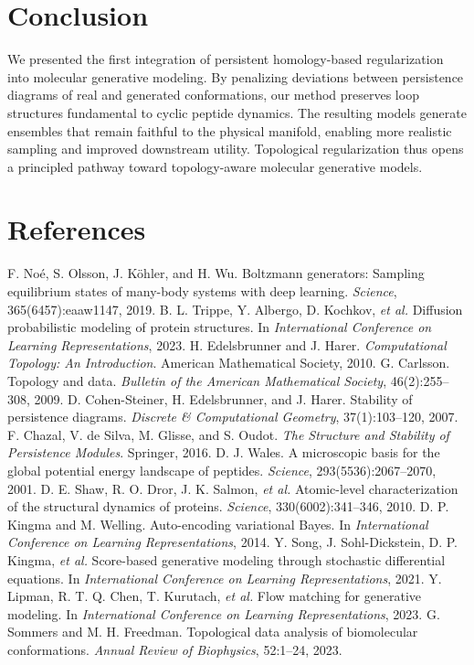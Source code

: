 \documentclass[11pt]{article}
\begin{document}
\section{Conclusion}
We presented the first integration of persistent homology-based regularization into molecular generative modeling. By penalizing deviations between persistence diagrams of real and generated conformations, our method preserves loop structures fundamental to cyclic peptide dynamics. The resulting models generate ensembles that remain faithful to the physical manifold, enabling more realistic sampling and improved downstream utility. Topological regularization thus opens a principled pathway toward topology-aware molecular generative models.

\section*{References}
\begin{thebibliography}{99}
 F. No{\'e}, S. Olsson, J. K{\"o}hler, and H. Wu. Boltzmann generators: Sampling equilibrium states of many-body systems with deep learning. \emph{Science}, 365(6457):eaaw1147, 2019.
 B. L. Trippe, Y. Albergo, D. Kochkov, \emph{et al.} Diffusion probabilistic modeling of protein structures. In \emph{International Conference on Learning Representations}, 2023.
 H. Edelsbrunner and J. Harer. \emph{Computational Topology: An Introduction}. American Mathematical Society, 2010.
 G. Carlsson. Topology and data. \emph{Bulletin of the American Mathematical Society}, 46(2):255--308, 2009.
 D. Cohen-Steiner, H. Edelsbrunner, and J. Harer. Stability of persistence diagrams. \emph{Discrete \& Computational Geometry}, 37(1):103--120, 2007.
 F. Chazal, V. de Silva, M. Glisse, and S. Oudot. \emph{The Structure and Stability of Persistence Modules}. Springer, 2016.
 D. J. Wales. A microscopic basis for the global potential energy landscape of peptides. \emph{Science}, 293(5536):2067--2070, 2001.
 D. E. Shaw, R. O. Dror, J. K. Salmon, \emph{et al.} Atomic-level characterization of the structural dynamics of proteins. \emph{Science}, 330(6002):341--346, 2010.
 D. P. Kingma and M. Welling. Auto-encoding variational Bayes. In \emph{International Conference on Learning Representations}, 2014.
 Y. Song, J. Sohl-Dickstein, D. P. Kingma, \emph{et al.} Score-based generative modeling through stochastic differential equations. In \emph{International Conference on Learning Representations}, 2021.
 Y. Lipman, R. T. Q. Chen, T. Kurutach, \emph{et al.} Flow matching for generative modeling. In \emph{International Conference on Learning Representations}, 2023.
 G. Sommers and M. H. Freedman. Topological data analysis of biomolecular conformations. \emph{Annual Review of Biophysics}, 52:1--24, 2023.
\end{thebibliography}
\end{document}
